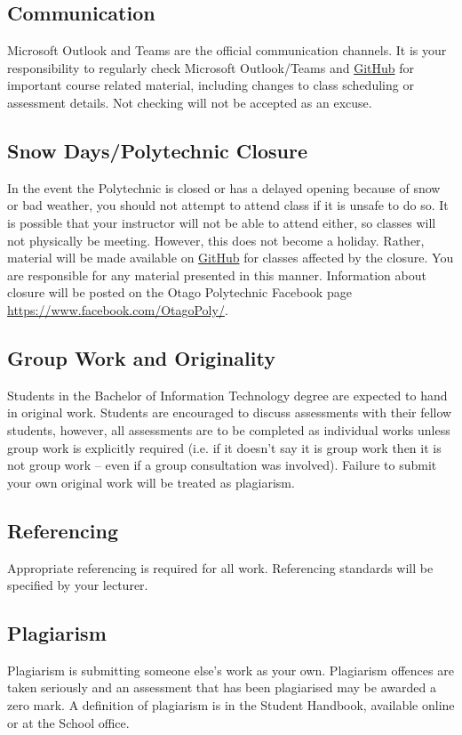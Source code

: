 \documentclass{article}
\begin{document}
\subsection*{Communication}
Microsoft Outlook and Teams are the official communication channels. It is your responsibility to regularly check Microsoft Outlook/Teams and \href{https://github.com/Grayson-Orr/Course-Files}{GitHub} for important course related material, including changes to class scheduling or assessment details. Not checking will not be accepted as an excuse.

\subsection*{Snow Days/Polytechnic Closure}
In the event the Polytechnic is closed or has a delayed opening because of snow or bad weather, you should not attempt to attend class if it is unsafe to do so. It is possible that your instructor will not be able to attend either, so classes will not physically be meeting. However, this does not become a holiday. Rather, material will be made available on \href{https://github.com/Grayson-Orr/Course-Files}{GitHub} for classes affected by the closure. You are responsible for any material presented in this manner. Information about closure will be posted on the Otago Polytechnic Facebook page \href{https://www.facebook.com/OtagoPoly/}{https://www.facebook.com/OtagoPoly/}.

\subsection*{Group Work and Originality}
Students in the Bachelor of Information Technology degree are expected to hand in original work. Students are encouraged to discuss assessments with their fellow students, however, all assessments are to be completed as individual works unless group work is explicitly required (i.e. if it doesn’t say it is group work then it is not group work – even if a group consultation was involved). Failure to submit your own original work will be treated as plagiarism.

\subsection*{Referencing}
Appropriate referencing is required for all work. Referencing standards will be specified by your lecturer.

\subsection*{Plagiarism}
Plagiarism is submitting someone else’s work as your own. Plagiarism offences are taken seriously and an assessment that has been plagiarised may be awarded a zero mark. A definition of plagiarism is in the Student Handbook, available online or at the School office.
\end{document}
